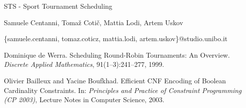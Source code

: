 \documentclass{article}
\date{September 2025}
\begin{document}
    \begin{titlepage}
        \begin{center}
            {\LARGE STS - Sport Tournament Scheduling }
            \vspace*{1em}
            
            Samuele Centanni, Tomaž Cotič, Mattia Lodi, Artem Uskov

            \centerline{\{samuele.centanni, tomaz.coticz, mattia.lodi, artem.uskov\}@studio.unibo.it}
        \end{center}
    \end{titlepage}

  
     
    

\begin{thebibliography}{9}

Dominique de Werra.
\newblock Scheduling Round-Robin Tournaments: An Overview.
\newblock \emph{Discrete Applied Mathematics}, 91(1–3):241--277, 1999.

Olivier Bailleux and Yacine Boufkhad.
\newblock Efficient CNF Encoding of Boolean Cardinality Constraints.
\newblock In: \emph{Principles and Practice of Constraint Programming (CP 2003)}, Lecture Notes in Computer Science, 2003.
\end{thebibliography}
\end{document}
